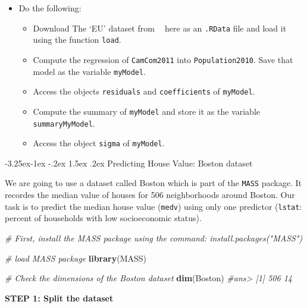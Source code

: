 \documentclass[]{book}
\makeatletter
\newenvironment{Shaded}{\begin{snugshade}}{\end{snugshade}}
\newcommand{\KeywordTok}[1]{\textcolor[rgb]{0.13,0.29,0.53}{\textbf{#1}}}
\newcommand{\CommentTok}[1]{\textcolor[rgb]{0.56,0.35,0.01}{\textit{#1}}}
\newcommand{\NormalTok}[1]{#1}
\providecommand{\tightlist}{%
  \setlength{\itemsep}{0pt}\setlength{\parskip}{0pt}}
\newenvironment{rmdblock}[1]
  {\begin{shaded*}
  \begin{itemize}
  \renewcommand{\labelitemi}{
    \raisebox{-.7\height}[0pt][0pt]{
      {\setkeys{Gin}{width=2em,keepaspectratio}\texttt{[image: img/icons/\#1]}}
    }
  }
  \item
  }
  {
  \end{itemize}
  \end{shaded*}
  }
\newenvironment{rmdexercise}
  {\begin{rmdblock}{exercise}}
  {\end{rmdblock}}
\renewcommand\subsection{\@startsection{subsection}{2}{\z@}%
                                     {-3.25ex\@plus -1ex \@minus -.2ex}%
                                     {1.5ex \@plus .2ex}%
                                     {\normalfont\large\bfseries\color{Violet}}}
\theoremstyle{definition}
\theoremstyle{definition}
\theoremstyle{definition}
\theoremstyle{remark}
\makeatother
\begin{document}
\begin{rmdexercise}
Do the following:

\begin{itemize}
\tightlist
\item
  Download The `EU' dataset from
  \textcolor{white}{[}\faTable\textcolor{white}{]} here as an
  \texttt{.RData} file and load it using the function \texttt{load}.
\item
  Compute the regression of \texttt{CamCom2011} into
  \texttt{Population2010}. Save that model as the variable
  \texttt{myModel}.
\item
  Access the objects \texttt{residuals} and \texttt{coefficients} of
  \texttt{myModel}.
\item
  Compute the summary of \texttt{myModel} and store it as the variable
  \texttt{summaryMyModel}.
\item
  Access the object \texttt{sigma} of \texttt{myModel}.
\end{itemize}
\end{rmdexercise}

\subsection{Predicting House Value: Boston dataset}\label{boston}

We are going to use a dataset called Boston which is part of the
\texttt{MASS} package. It recordes the median value of houses for 506
neighborhoods around Boston. Our task is to predict the median house
value (\texttt{medv}) using only one predictor (\texttt{lstat}: percent
of households with low socioeconomic status).

\begin{Shaded}
\begin{Highlighting}[]
\CommentTok{# First, install the MASS package using the command: install.packages("MASS")}

\CommentTok{# load MASS package}
\KeywordTok{library}\NormalTok{(MASS)}

\CommentTok{# Check the dimensions of the Boston dataset}
\KeywordTok{dim}\NormalTok{(Boston)}
\CommentTok{#ans> [1] 506  14}
\end{Highlighting}
\end{Shaded}

\textbf{STEP 1: Split the dataset}
\end{document}
